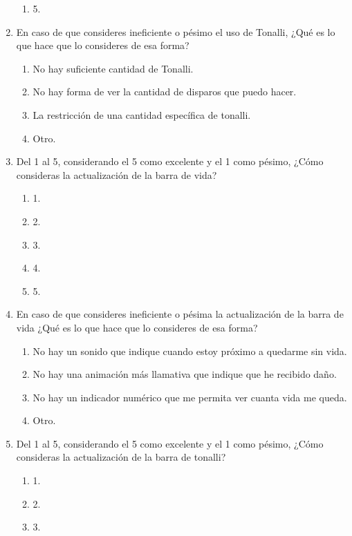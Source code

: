 \begin{enumerate}
\begin{enumerate}
            \item 5.
        \end{enumerate}
    \item En caso de que consideres ineficiente o pésimo el uso de Tonalli, ¿Qué
    es lo que hace que lo consideres de esa forma?
        \begin{enumerate}
            \item No hay suficiente cantidad de Tonalli.
            \item No hay forma de ver la cantidad de disparos que puedo hacer.
            \item La restricción de una cantidad específica de tonalli.
            \item Otro.
        \end{enumerate}
    \item Del 1 al 5, considerando el 5 como excelente y el 1 como pésimo, ¿Cómo     consideras la actualización de la barra de vida?
        \begin{enumerate}
            \item 1.
            \item 2.
            \item 3.
            \item 4.
            \item 5.
        \end{enumerate}
    \item En caso de que consideres ineficiente o pésima la actualización de la
    barra de vida ¿Qué es lo que hace que lo consideres de esa forma?
        \begin{enumerate}
            \item No hay un sonido que indique cuando estoy próximo a quedarme
            sin vida.
            \item No hay una animación más llamativa que indique que he recibido
            daño.
            \item No hay un indicador numérico que me permita ver cuanta vida me
            queda.
            \item Otro.
        \end{enumerate}
    \item Del 1 al 5, considerando el 5 como excelente y el 1 como pésimo, ¿Cómo
    consideras la actualización de la barra de tonalli?
        \begin{enumerate}
            \item 1.
            \item 2.
            \item 3.

\end{enumerate}
\end{enumerate}
